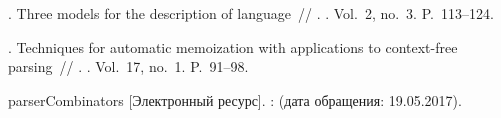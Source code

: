 \begin{thebibliography}{10}
. Three models for the description of language~//
  . \BibDash
{}. \BibDash
\newblock Vol.~2, no.~3. \BibDash
\newblock P.~113--124.

. Techniques for automatic memoization with applications
  to context-free parsing~// . \BibDash
{}. \BibDash
\newblock Vol.~17, no.~1. \BibDash
\newblock P.~91--98.

parserCombinators [Электронный ресурс]. \BibDash
{}:
   ({дата
  обращения}: 19.05.2017).

\end{thebibliography}
